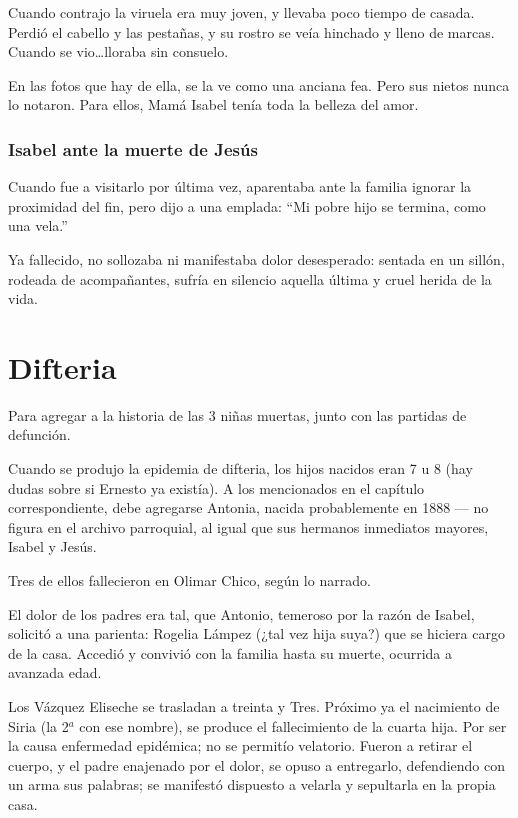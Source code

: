 \documentclass[a4paper]{article}
\begin{document}
\bigbreak{}

Cuando contrajo la viruela era muy joven, y llevaba poco tiempo de casada. Perdió el cabello y las pestañas, y su rostro se veía hinchado y lleno de marcas. Cuando se vio\ldots lloraba sin consuelo.

En las fotos que hay de ella, se la ve como una anciana fea. Pero sus nietos nunca lo notaron. Para ellos, Mamá Isabel tenía toda la belleza del amor.

\subsubsection{Isabel ante la muerte de Jesús}

Cuando fue a visitarlo por última vez, aparentaba ante la familia ignorar la proximidad del fin, pero dijo a una emplada: ``Mi pobre hijo se termina, como una vela.''

Ya fallecido, no sollozaba ni manifestaba dolor desesperado: sentada en un sillón, rodeada de acompañantes, sufría en silencio aquella última y cruel herida de la vida.

\section{Difteria}

Para agregar a la historia de las 3 niñas muertas, junto con las partidas de defunción.

Cuando se produjo la epidemia de difteria, los hijos nacidos eran 7 u 8 (hay dudas sobre si Ernesto ya existía). A los mencionados en el capítulo correspondiente, debe agregarse Antonia, nacida probablemente en 1888 --- no figura en el archivo parroquial, al igual que sus hermanos inmediatos mayores, Isabel y Jesús.

Tres de ellos fallecieron en Olimar Chico, según lo narrado.

El dolor de los padres era tal, que Antonio, temeroso por la razón de Isabel, solicitó a una parienta: Rogelia Lámpez (¿tal vez hija suya?) que se hiciera cargo de la casa. Accedió y convivió con la familia hasta su muerte, ocurrida a avanzada edad.

Los Vázquez Eliseche se trasladan a treinta y Tres. Próximo ya el nacimiento de Siria (la 2$^{a}$ con ese nombre), se produce el fallecimiento de la cuarta hija. Por ser la causa enfermedad epidémica; no se permitío velatorio. Fueron a retirar el cuerpo, y el padre enajenado por el dolor, se opuso a entregarlo, defendiendo con un arma sus palabras; se manifestó dispuesto a velarla y sepultarla en la propia casa.
\end{document}
